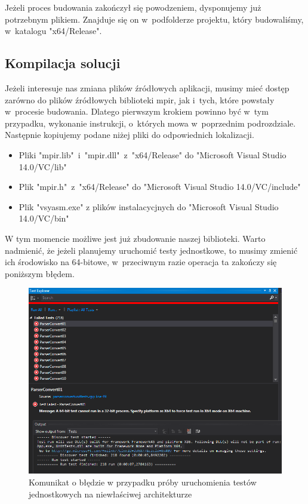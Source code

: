 Jeżeli proces budowania zakończył się powodzeniem, dysponujemy już potrzebnym plikiem. Znajduje się on w~podfolderze projektu, który budowaliśmy, w~katalogu "x64/Release".

\subsection{Kompilacja solucji}

Jeżeli interesuje nas zmiana plików źródłowych aplikacji, musimy mieć dostęp zarówno do plików źródłowych biblioteki mpir, jak i~tych, które powstały w~procesie budowania. Dlatego pierwszym krokiem powinno być w~tym przypadku, wykonanie instrukcji, o~których mowa w~poprzednim podrozdziale. Następnie kopiujemy podane niżej pliki do odpowiednich lokalizacji.

\begin{itemize}
	\item Pliki "mpir.lib"\ i~"mpir.dll"\ z~"x64/Release" do "Microsoft Visual Studio 14.0/VC/lib"
	\item Plik "mpir.h"\ z~"x64/Release" do "Microsoft Visual Studio 14.0/VC/include"
	\item Plik "vsyasm.exe" z plików instalacycjnych do "Microsoft Visual Studio 14.0/VC/bin"
\end{itemize}

W tym momencie możliwe jest już zbudowanie naszej biblioteki. Warto nadmienić, że jeżeli planujemy uruchomić testy jednostkowe, to musimy zmienić ich środowisko na 64-bitowe, w~przeciwnym razie operacja ta zakończy się poniższym błędem.

\begin{figure}[H]
	\includegraphics[width=15cm]{img/UnitTests_wrong_architecture.png}
	\caption{Komunikat o błędzie w przypadku próby uruchomienia testów jednostkowych na niewłaściwej architekturze}
\end{figure}

